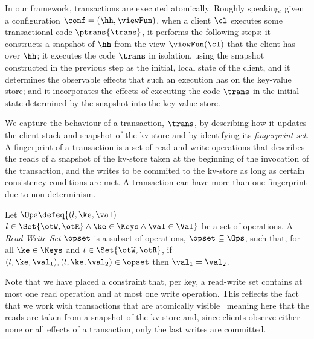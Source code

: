 In our framework, transactions are executed atomically. 
Roughly speaking, given a configuration $\conf = (\hh, \viewFun)$, 
when a client $\cl$ executes some transactional code $\ptrans{\trans}$, 
 it performs the following steps: 
it constructs a snapshot of $\hh$ from the view $\viewFun(\cl)$ that 
the client has over $\hh$;  it executes the code $\trans$ in isolation, using the 
snapshot constructed in the previous step as the initial, local state
of the client, and it determines the observable 
effects that such an execution has on the key-value store; and  it incorporates 
the effects of executing the code $\trans$ in the initial state determined by the snapshot into 
the key-value store.

We capture  the behaviour of a  transaction,
$\trans$,
by describing how it updates the client stack and snapshot of 
the kv-store and by  identifying   its {\em fingerprint set}.
A fingerprint of a transaction
is a set of read and write operations that describes  the 
reads of a snapshot of the kv-store taken  at the beginning of
the invocation of the transaction, and the writes to be
commited to the kv-store  as long as certain
consistency conditions are met. A transaction can have more than one fingerprint due to
non-determinism. 








\begin{definition}
\label{beebop}
Let 
$\Ops \defeq \{(l, \ke, \val) \mid$ $ l \in \Set{\otW, \otR} \land \ke \in \Keys \wedge \val \in \Val \}$ 
be a set of operations. 
A \emph{Read-Write Set} $\opset$ is a subset of operations, $\opset \subseteq \Ops$,
such that, for all $\ke \in \Keys$ and \( l  \in \Set{\otW, \otR} \),
if $(l, \ke, \val_1), (l, \ke, \val_2) \in \opset$ then $\val_1 = \val_2$.
\end{definition}
Note that we have placed a constraint that, per key, a read-write set
contains at most one read operation and at most one write operation.
This reflects the fact that we work with transactions that are
atomically visible~\cite{laws} meaning here that the reads are taken
from a snapshot of the kv-store and, since clients observe either none
or all effects of a transaction, only the last writes are 
committed.


